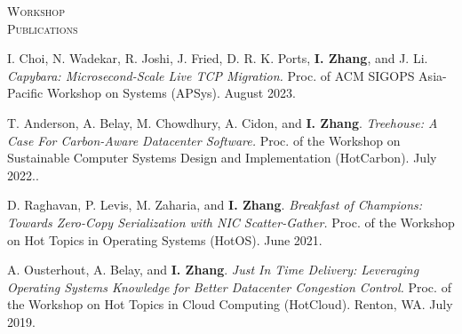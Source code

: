 \documentclass[10pt,times]{report}
\newlength{\sectiongap}
\newlength{\sectioncolwidth}
\newlength{\colgap}
\newlength{\stuffwidth}
\newenvironment{rtable}{
  \begin{minipage}{\textwidth}
  }{
  \end{minipage}
}
\newenvironment{rsection}[1]{
  \begin{minipage}[t]{\sectioncolwidth}
    \textsc{#1}
  \end{minipage}
  \hspace{\colgap}
  \begin{minipage}[t]{\stuffwidth}
  }{
    \removelastskip
  \end{minipage}
  \\[\sectiongap]
}
\begin{document}
\begin{rtable}
\begin{rsection}{Workshop\\Publications}
    I. Choi, N. Wadekar, R. Joshi, J. Fried, D. R. K. Ports,
    \textbf{I. Zhang}, and J. Li. \textit{Capybara: Microsecond-Scale
      Live TCP Migration.}  Proc. of ACM SIGOPS Asia-Pacific Workshop on
    Systems (APSys). August 2023.\\\vspace{-0.5em}

    T. Anderson, A. Belay, M. Chowdhury, A. Cidon, and \textbf{I. Zhang}.
    \textit{    Treehouse: A Case For Carbon-Aware Datacenter Software.}
   Proc. of the Workshop on Sustainable Computer Systems Design and
   Implementation (HotCarbon). July 2022..\\\vspace{-0.5em}

    D. Raghavan, P. Levis, M. Zaharia, and
    \textbf{I. Zhang}. \textit{Breakfast of Champions: Towards
      Zero-Copy Serialization with NIC Scatter-Gather.}  Proc.
    of the Workshop on Hot Topics in Operating Systems (HotOS). June
    2021.\\\vspace{-0.5em}

    A. Ousterhout, A. Belay, and \textbf{I. Zhang}. \textit{Just In
      Time Delivery: Leveraging Operating Systems Knowledge for Better
      Datacenter Congestion Control.  } Proc. of the Workshop on
    Hot Topics in Cloud Computing (HotCloud). Renton, WA. July
    2019.
  \end{rsection}

\end{rtable}
\end{document}
